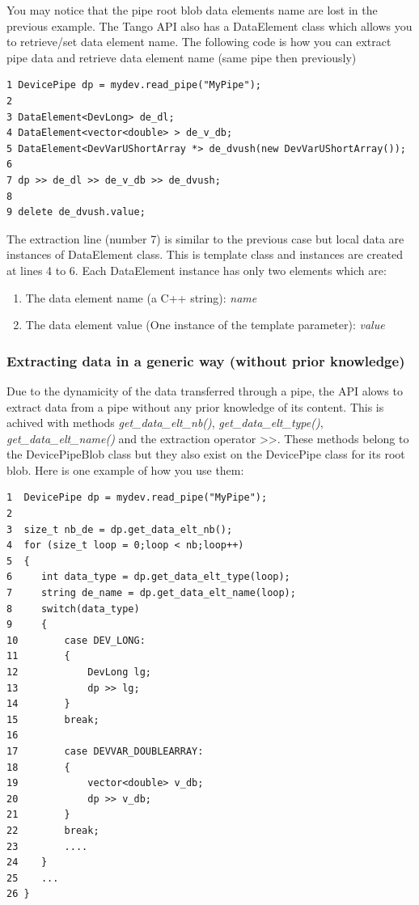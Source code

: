 You may notice that the pipe root blob data elements name are lost
in the previous example. The Tango API also has a DataElement
class which allows you to retrieve/set data element name. The following
code is how you can extract pipe data and retrieve data element name
(same pipe then previously)


\begin{verbatim}
1 DevicePipe dp = mydev.read_pipe("MyPipe");
2 
3 DataElement<DevLong> de_dl;  
4 DataElement<vector<double> > de_v_db;  
5 DataElement<DevVarUShortArray *> de_dvush(new DevVarUShortArray());
6 
7 dp >> de_dl >> de_v_db >> de_dvush;
8
9 delete de_dvush.value;
\end{verbatim}


The extraction line (number 7) is similar to the previous case but
local data are instances of DataElement class. This is template class
and instances are created at lines 4 to 6. Each DataElement instance
has only two elements which are:
\begin{enumerate}
\item The data element name (a C++ string): \emph{name}
\item The data element value (One instance of the template parameter): \emph{value}
\end{enumerate}

\subsubsection{Extracting data in a generic way (without prior knowledge)}

Due to the dynamicity of the data transferred through a pipe, the
API alows to extract data from a pipe without any prior knowledge
of its content. This is achived with methods \emph{get\_data\_elt\_nb()},
\emph{get\_data\_elt\_type()}, \emph{get\_data\_elt\_name()} and the
extraction operator \textquotedbl{}>\textcompwordmark{}>\textquotedbl{}.
These methods belong to the DevicePipeBlob class but they also exist
on the DevicePipe class for its root blob. Here is one example of
how you use them:


\begin{verbatim}
1  DevicePipe dp = mydev.read_pipe("MyPipe");
2
3  size_t nb_de = dp.get_data_elt_nb();  
4  for (size_t loop = 0;loop < nb;loop++)
5  {      
6     int data_type = dp.get_data_elt_type(loop);      
7     string de_name = dp.get_data_elt_name(loop);      
8     switch(data_type)      
9     {         
10        case DEV_LONG:         
11        {             
12            DevLong lg;             
13            dp >> lg;         
14        }         
15        break;
16        
17        case DEVVAR_DOUBLEARRAY:         
18        {             
19            vector<double> v_db;             
20            dp >> v_db;         
21        }         
22        break;         
23        ....      
24    }  
25    ...  
26 }
\end{verbatim}


